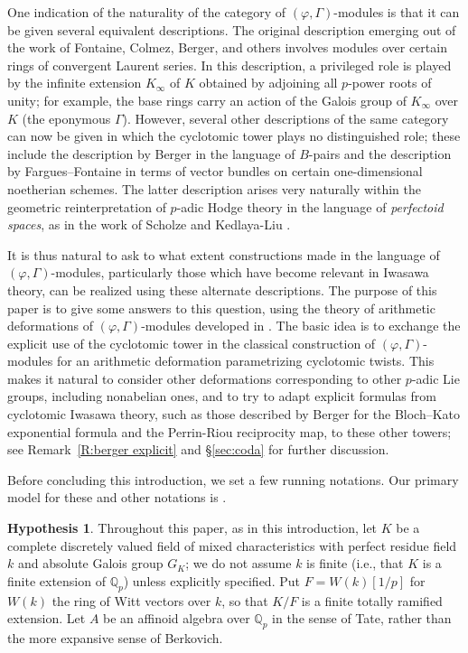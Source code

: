 \documentclass[12pt]{amsart}
\theoremstyle{definition}
\newtheorem{hypothesis}[theorem]{Hypothesis}
\numberwithin{equation}{theorem}
\newcommand{\QQ}{\mathbb{Q}}
\begin{document}
One indication of the naturality of the category of $(\varphi, \Gamma)$-modules is that it can be given several equivalent descriptions. The original description emerging out of the work of Fontaine, Colmez, Berger, and others involves modules over certain rings of convergent Laurent series. In this description, a privileged role is played by the infinite extension $K_\infty$ of $K$ obtained by adjoining all $p$-power roots of unity; for example, the base rings carry an action of the Galois group of $K_\infty$ over $K$ (the eponymous $\Gamma$). However, several other descriptions of the same category can now be given in which the cyclotomic tower plays no distinguished role; these include the description by Berger in the language of $B$-pairs and the description by Fargues--Fontaine in terms of vector bundles on certain one-dimensional noetherian schemes. The latter description arises very naturally within the geometric reinterpretation of $p$-adic Hodge theory in the language of \emph{perfectoid spaces}, as in the work of Scholze \cite{scholze1, scholze2, scholze-icm} and Kedlaya-Liu \cite{kedlaya-liu1, kedlaya-liu2}.

It is thus natural to ask to what extent constructions made in the language of $(\varphi, \Gamma)$-modules, particularly those which have become relevant in Iwasawa theory, can be realized using these alternate descriptions. The purpose of this paper is to give some answers to this question, using the theory of arithmetic deformations of $(\varphi, \Gamma)$-modules developed in \cite{kpx}. The basic idea is to exchange the explicit use of the cyclotomic tower in the classical construction of $(\varphi, \Gamma)$-modules for an arithmetic deformation parametrizing cyclotomic twists. This makes it natural to consider other deformations corresponding to other $p$-adic Lie groups, including nonabelian ones, and to try to adapt explicit formulas from cyclotomic Iwasawa theory,
such as those described by Berger \cite{berger-explicit} for the Bloch--Kato exponential formula and the Perrin-Riou reciprocity map, to these other towers;
see Remark~\ref{R:berger explicit} and \S\ref{sec:coda} for further discussion.

Before concluding this introduction, we set a few running notations. Our primary model for these and other notations is \cite{kpx}.
\setcounter{theorem}{0}
\begin{hypothesis}
Throughout this paper, as in this introduction, let $K$ be a complete discretely valued field of mixed characteristics with perfect residue field $k$ and absolute Galois group $G_K$; we do not assume $k$ is finite (i.e., that $K$ is a finite extension of $\QQ_p$) unless explicitly specified.
Put $F = W(k)[1/p]$ for $W(k)$ the ring of Witt vectors over $k$, so that $K/F$ is a finite totally ramified extension.
Let $A$ be an affinoid algebra over $\QQ_p$ in the sense of Tate, rather than the more expansive sense of Berkovich. 
\end{hypothesis}
\end{document}
